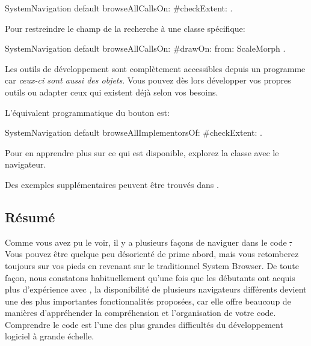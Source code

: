 \documentclass[a4paper,10pt,twoside]{book}
\begin{document}

\begin{code}{}
SystemNavigation default browseAllCallsOn: #checkExtent: .
\end{code}
Pour restreindre le champ de la recherche \`a une classe sp\'ecifique:
\begin{code}{}
SystemNavigation default browseAllCallsOn: #drawOn: from: ScaleMorph .
\end{code}
Les outils de d\'eveloppement sont compl\`{e}tement accessibles depuis un
programme car \emph{ceux-ci sont aussi des objets}. Vous pouvez d\`es lors
d\'evelopper vos propres outils ou adapter ceux qui existent d\'ej\`a
selon vos besoins.

L'\'equivalent programmatique du bouton  est:
\begin{code}{}
SystemNavigation default browseAllImplementorsOf: #checkExtent: .
\end{code}

Pour en apprendre plus sur ce qui est disponible, explorez la classe
 avec le navigateur.

Des exemples suppl\'ementaires peuvent \^etre trouv\'es dans
 .


\subsection{R\'esum\'e}

Comme vous avez pu le voir, il y a plusieurs fa\c{c}ons de naviguer
dans le code \st.
Vous pouvez \^etre quelque peu d\'esorient\'e de prime abord, mais
vous retomberez toujours sur vos pieds en revenant sur le 
traditionnel System Browser.
De toute fa\c{c}on, nous constatons habituellement qu'une fois que les
d\'ebutants ont acquis plus d'exp\'erience avec \sq, la disponibilit\'e
de plusieurs navigateurs diff\'erents devient une des plus
importantes fonctionnalit\'es propos\'ees, car elle offre beaucoup de
mani\`eres d'appr\'ehender la compr\'ehension et l'organisation de votre
code.
Comprendre le code est l'une des plus grandes difficult\'es du d\'eveloppement
logiciel \`a grande \'echelle.
\end{document}
